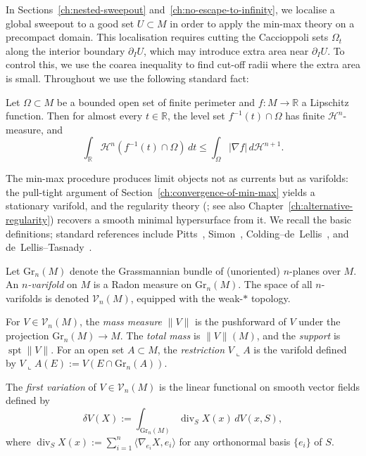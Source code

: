 In Sections~\ref{ch:nested-sweepout} and~\ref{ch:no-escape-to-infinity}, we localise a global sweepout to a good set $U \subset M$ in order to apply the min-max theory on a precompact domain. This localisation requires cutting the Caccioppoli sets $\Omega_t$ along the interior boundary $\partial_I U$, which may introduce extra area near $\partial_I U$. To control this, we use the coarea inequality to find cut-off radii where the extra area is small. Throughout we use the following standard fact:

\begin{lemma}\label{lem:coarea}
Let $\Omega \subset M$ be a bounded open set of finite perimeter and $f\colon M \to \mathbb{R}$ a Lipschitz function. Then for almost every $t \in \mathbb{R}$, the level set $f^{-1}(t) \cap \Omega$ has finite $\mathcal{H}^n$-measure, and
\[
\int_{\mathbb{R}} \mathcal{H}^n(f^{-1}(t) \cap \Omega)\, dt \leq \int_\Omega |\nabla f|\, d\mathcal{H}^{n+1}.
\]
\end{lemma}

The min-max procedure produces limit objects not as currents but as varifolds: the pull-tight argument of Section~\ref{ch:convergence-of-min-max} yields a stationary varifold, and the regularity theory (\cite[Theorem~6.2]{LZ17}; see also Chapter~\ref{ch:alternative-regularity}) recovers a smooth minimal hypersurface from it. We recall the basic definitions; standard references include Pitts~\cite{Pit81}, Simon~\cite{Sim84}, Colding--de~Lellis~\cite{CL03}, and de~Lellis--Tasnady~\cite{DLT13}.

\begin{definition}[Varifolds]\label{def:varifold}
Let $\mathrm{Gr}_n(M)$ denote the Grassmannian bundle of (unoriented) $n$-planes over $M$. An \emph{$n$-varifold} on $M$ is a Radon measure on $\mathrm{Gr}_n(M)$. The space of all $n$-varifolds is denoted $\mathcal{V}_n(M)$, equipped with the weak-$*$ topology.

For $V \in \mathcal{V}_n(M)$, the \emph{mass measure} $\|V\|$ is the pushforward of $V$ under the projection $\mathrm{Gr}_n(M) \to M$. The \emph{total mass} is $\|V\|(M)$, and the \emph{support} is $\operatorname{spt}\|V\|$. For an open set $A \subset M$, the \emph{restriction} $V \llcorner A$ is the varifold defined by $V \llcorner A(E) := V(E \cap \mathrm{Gr}_n(A))$.
\end{definition}

\begin{definition}\label{def:first-variation}
The \emph{first variation} of $V \in \mathcal{V}_n(M)$ is the linear functional on smooth vector fields defined by
\[
\delta V(X) := \int_{\mathrm{Gr}_n(M)} \operatorname{div}_S X(x) \, dV(x, S),
\]
where $\operatorname{div}_S X(x) := \sum_{i=1}^n \langle \nabla_{e_i} X, e_i \rangle$ for any orthonormal basis $\{e_i\}$ of $S$.
\end{definition}

